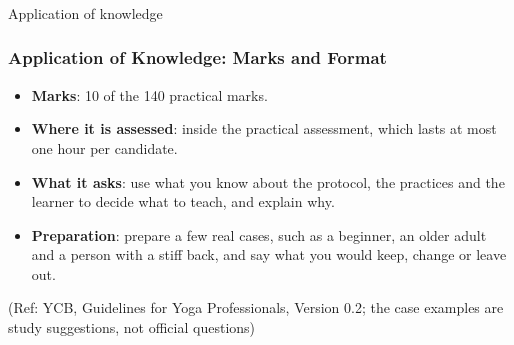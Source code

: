 \begin{frame}[fragile]\frametitle{}
\begin{center}
{\Large Application of knowledge }
\end{center}
\end{frame}


\begin{frame}[fragile]\frametitle{Application of Knowledge: Marks and Format}
\begin{itemize}
\item \textbf{Marks}: 10 of the 140 practical marks.
\item \textbf{Where it is assessed}: inside the practical assessment, which lasts at most one hour per candidate.
\item \textbf{What it asks}: use what you know about the protocol, the practices and the learner to decide what to teach, and explain why.
\item \textbf{Preparation}: prepare a few real cases, such as a beginner, an older adult and a person with a stiff back, and say what you would keep, change or leave out.
\end{itemize}
{\tiny (Ref: YCB, Guidelines for Yoga Professionals, Version 0.2; the case examples are study suggestions, not official questions)}
\end{frame}

